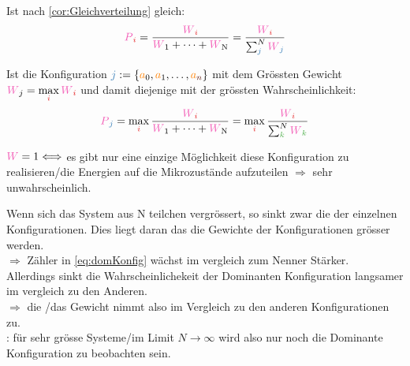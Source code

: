 \begin{defnbox}\nospacing
  \begin{defn}[Wahrscheinlichkeit einer\\Konfiguration \tc{black}{$\idxi:=\{\mca_0,\mca_1,\ldots,\mca_{\idxn}\}$}]\nospacing
    Ist nach \cref{cor:Gleichverteilung} gleich:
    \begin{align}
      \Pb_{\idxi}=\frac{\Wg_{\idxi}}{\Wg_1+\cdots+\Wg_{\Nz}}=\frac{\Wg_{\idxi}}{\sum_{\idxj}^N\Wg_{\idxj}}
    \end{align}
  \end{defn}
\end{defnbox}
\begin{defnbox}\nospacing
  \begin{defn}\nospacing
    Ist die Konfiguration $\idxj:=\{\mca_0,\mca_1,\ldots,\mca_{\idxn}\}$ mit dem Grössten Gewicht $\Wg_j=\max\limits_{\idxi}\Wg_{\idxi}$ und damit diejenige mit der grössten Wahrscheinlichkeit:
    \begin{align}
      \Pb_{\idxj}=\max_{\idxi}\frac{\Wg_{\idxi}}{\Wg_1+\cdots+\Wg_{\Nz}}=\max_{\idxi}\frac{\Wg_{\idxi}}{\sum_{\idxk}^N\Wg_{\idxk}}\label{eq:domKonfig}
    \end{align}
  \end{defn}
\end{defnbox}
\begin{notebox}[Bemerkungen]\nospacing
  \begin{numberlist}
      \item $\Wg=1 \Longleftrightarrow$ es gibt nur eine einzige Möglichkeit diese Konfiguration zu realisieren/die Energien auf die Mikrozustände aufzuteilen
    $\Rightarrow$ sehr unwahrscheinlich.
      \item Wenn sich das System aus N teilchen vergrössert, so sinkt zwar die  der einzelnen Konfigurationen.
    Dies liegt daran das die Gewichte der Konfigurationen grösser werden.\\
    $\Rightarrow$ Zähler in \cref{eq:domKonfig} wächst im vergleich zum Nenner Stärker.\\
    Allerdings sinkt die Wahrscheinlichekeit der Dominanten Konfiguration langsamer im vergleich zu den Anderen.\\
    $\Rightarrow$ die /das Gewicht nimmt also im Vergleich zu den anderen Konfigurationen zu.\\
    : für sehr grösse Systeme/im Limit $N\to\infty$ wird also nur noch die Dominante Konfiguration zu beobachten sein.
  \end{numberlist}
\end{notebox}
